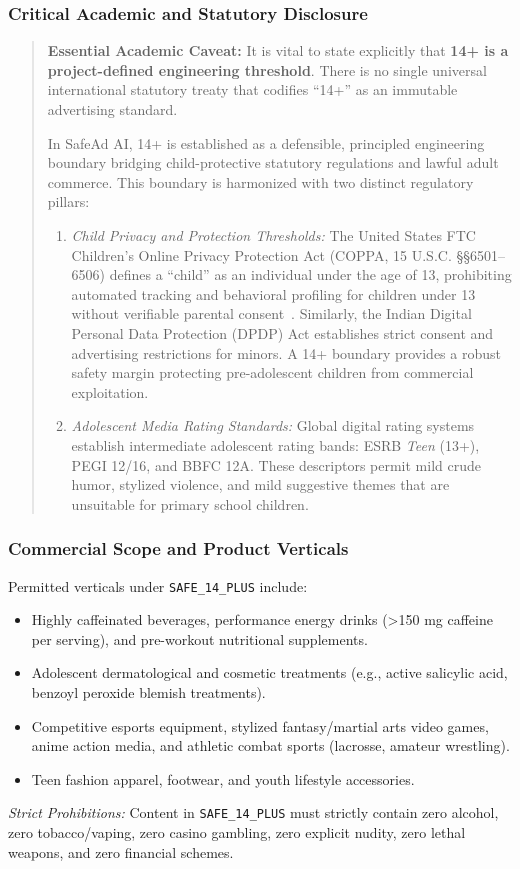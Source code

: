 \documentclass[12pt,a4paper]{report}
\begin{document}
\subsubsection{Critical Academic and Statutory Disclosure}
\begin{quote}
\textbf{Essential Academic Caveat:} It is vital to state explicitly that \textbf{14+ is a project-defined engineering threshold}. There is no single universal international statutory treaty that codifies ``14+'' as an immutable advertising standard. 

In SafeAd AI, 14+ is established as a defensible, principled engineering boundary bridging child-protective statutory regulations and lawful adult commerce. This boundary is harmonized with two distinct regulatory pillars:
\begin{enumerate}
    \item \emph{Child Privacy and Protection Thresholds:} The United States FTC Children's Online Privacy Protection Act (COPPA, 15 U.S.C. \S \S  6501--6506) defines a ``child'' as an individual under the age of 13, prohibiting automated tracking and behavioral profiling for children under 13 without verifiable parental consent~\cite{ftc2023guides}. Similarly, the Indian Digital Personal Data Protection (DPDP) Act establishes strict consent and advertising restrictions for minors. A 14+ boundary provides a robust safety margin protecting pre-adolescent children from commercial exploitation.
    \item \emph{Adolescent Media Rating Standards:} Global digital rating systems establish intermediate adolescent rating bands: ESRB \emph{Teen} (13+), PEGI 12/16, and BBFC 12A. These descriptors permit mild crude humor, stylized violence, and mild suggestive themes that are unsuitable for primary school children.
\end{enumerate}
\end{quote}

\subsubsection{Commercial Scope and Product Verticals}
Permitted verticals under \texttt{SAFE\_14\_PLUS} include:
\begin{itemize}
    \item Highly caffeinated beverages, performance energy drinks (>150 mg caffeine per serving), and pre-workout nutritional supplements.
    \item Adolescent dermatological and cosmetic treatments (e.g., active salicylic acid, benzoyl peroxide blemish treatments).
    \item Competitive esports equipment, stylized fantasy/martial arts video games, anime action media, and athletic combat sports (lacrosse, amateur wrestling).
    \item Teen fashion apparel, footwear, and youth lifestyle accessories.
\end{itemize}
\emph{Strict Prohibitions:} Content in \texttt{SAFE\_14\_PLUS} must strictly contain zero alcohol, zero tobacco/vaping, zero casino gambling, zero explicit nudity, zero lethal weapons, and zero financial schemes.
\end{document}
